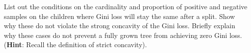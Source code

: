 \item {} List out the conditions on the cardinality and proportion of positive and negative samples on the children where Gini loss will stay the same after a split. Show why these do not violate the strong concavity of the Gini loss.  Briefly explain why these cases do not prevent a fully grown tree from achieving zero Gini loss. (\textbf{Hint}: Recall the definition of strict concavity).
